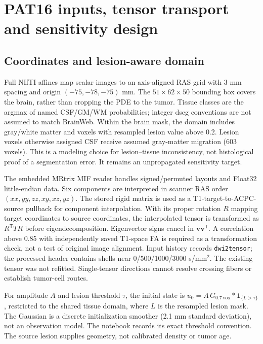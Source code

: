 \section{PAT16 inputs, tensor transport and sensitivity design}\label{app:pat16}
\subsection{Coordinates and lesion-aware domain}
Full NIfTI affines map scalar images to an axis-aligned RAS grid with 3 mm spacing and origin $(-75,-78,-75)$ mm. The $51\times62\times50$ bounding box covers the brain, rather than cropping the PDE to the tumor. Tissue classes are the argmax of named CSF/GM/WM probabilities; integer dseg conventions are not assumed to match BrainWeb. Within the brain mask, the domain includes gray/white matter and voxels with resampled lesion value above 0.2. Lesion voxels otherwise assigned CSF receive assumed gray-matter migration (603 voxels). This is a modeling choice for lesion--tissue inconsistency, not histological proof of a segmentation error. It remains an unpropagated sensitivity target.

The embedded MRtrix MIF reader handles signed/permuted layouts and Float32 little-endian data. Six components are interpreted in scanner RAS order $(xx,yy,zz,xy,xz,yz)$. The stored rigid matrix is used as a T1-target-to-ACPC-source pullback for component interpolation. With its proper rotation $R$ mapping target coordinates to source coordinates, the interpolated tensor is transformed as $R^{\mathsf T}T R$ before eigendecomposition. Eigenvector signs cancel in $\bm v\bm v^{\mathsf T}$. A correlation above 0.85 with independently saved T1-space FA is required as a transformation check, not a test of original image alignment. Input history records \texttt{dwi2tensor}; the processed header contains shells near 0/500/1000/3000 s/mm$^2$. The existing tensor was not refitted. Single-tensor directions cannot resolve crossing fibers or establish tumor-cell routes.

For amplitude $A$ and lesion threshold $\tau$, the initial state is $u_0=A\,G_{0.7\,\mathrm{vox}}*\mathbf1_{\{L>\tau\}}$, restricted to the shared tissue domain, where $L$ is the resampled lesion mask. The Gaussian is a discrete initialization smoother (2.1 mm standard deviation), not an observation model. The notebook records its exact threshold convention. The source lesion supplies geometry, not calibrated density or tumor age.

